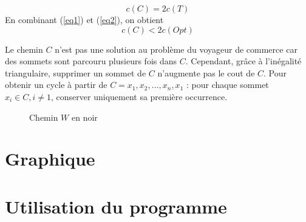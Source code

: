 \documentclass[a4paper,11pt]{article}
\begin{document}
\begin{equation}
c(C) = 2c(T)
\label{eq2}
\end{equation}
En combinant (\ref{eq1}) et (\ref{eq2}), on obtient
\begin{equation}
c(C) < 2c(Opt)
\label{eq2}
\end{equation}

Le chemin $C$ n'est pas une solution au problème du voyageur de commerce car des sommets sont parcouru plusieurs fois dans $C$. Cependant, grâce à l'inégalité triangulaire, supprimer un sommet de $C$ n’augmente pas le cout de $C$.
Pour obtenir un cycle à partir de $C = x_1, x_2, \ldots, x_n, x_1$ :
pour chaque sommet $x_i \in C, i\neq1$, conserver uniquement sa première occurrence.

\begin{figure}[!h]
\centering
{}
\caption{Chemin $W$ en noir}
\end{figure}

\section{Graphique} %

\section{Utilisation du programme} %
\end{document}
